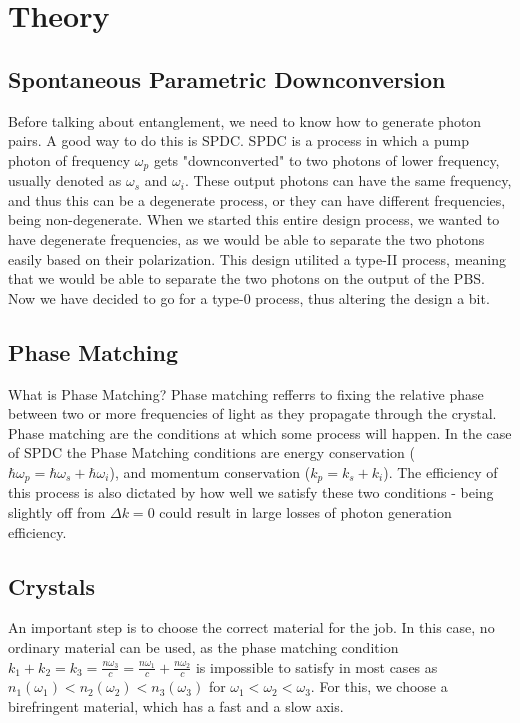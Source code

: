 \documentclass{article}
\theoremstyle{mytheoremstyle}
\theoremstyle{mytheoremstyle}
\theoremstyle{myproblemstyle}
\begin{document}
\section{Theory}
\subsection{Spontaneous Parametric Downconversion}
Before talking about entanglement, we need to know how to generate photon pairs. A good way to do this is SPDC.
SPDC is a process in which a pump photon of frequency $\omega_p$ gets "downconverted" to two photons of lower frequency,
usually denoted as $\omega_s$ and $\omega_i$. These output photons can have the same frequency,
and thus this can be a degenerate process, or they can have different frequencies, being non-degenerate.
When we started this entire design process, we wanted to have degenerate frequencies, as we would be able to separate
the two photons easily based on their polarization. This design utilited a type-II process, meaning that we would be able
to separate the two photons on the output of the PBS. Now we have decided to go for a type-0 process, thus altering the design a bit.

\subsection{Phase Matching}
What is Phase Matching? Phase matching refferrs to fixing the relative phase between two or more frequencies
of light as they propagate through the crystal. Phase matching are the conditions at which some process will happen.
In the case of SPDC the Phase Matching conditions are energy conservation ($\hbar \omega_p = \hbar \omega_s + \hbar \omega_i$),
and momentum conservation ($k_p = k_s + k_i$). The efficiency of this process is also dictated by how well we satisfy these
two conditions - being slightly off from $\Delta k = 0$ could result in large losses of photon generation efficiency.

\subsection{Crystals}
An important step is to choose the correct material for the job. In this case, no ordinary material can be used,
as the phase matching condition $k_1 + k_2 = k_3 = \frac{n \omega_3}{c} = \frac{n \omega_1}{c} + \frac{n \omega_2}{c}$ is
impossible to satisfy in most cases as
$n_1 \left(	\omega_1 \right) < n_2 \left( \omega_2 \right) < n_3 \left(	\omega_3 \right)$ for $\omega_1 < \omega_2 < \omega_3$.
For this, we choose a birefringent material, which has a fast and a slow axis.
\end{document}
